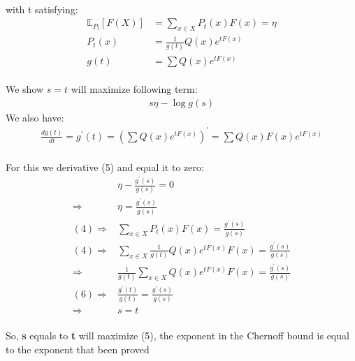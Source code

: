 \documentclass[
  course = {{EE623 Information Theory}},
  quartile = {{4}},
  assignment = 6,
  name = {{Mohammad Mahdi Rahimi}},
  studentnumber = {{20208244}},
  email = {{mahi@kaist.ac.kr}},
  firstexercise = 1
]{aga-homework}
\begin{document}
\newpage
\\
\exercise
\\\\
with t satisfying:
\begin{equation} \label{eq3}
\begin{split}
\mathbb{E}_P_t [F(X)] & = \sum_{x \in X} P_t(x)F(x) = \eta \\
P_t(x) & = \frac{1}{g(t)}Q(x)e^{tF(x)} \\
g(t) & = \sum{Q(x)e^{tF(x)}}
\end{split}
\end{equation}\\
We show $s = t$ will maximize following term:\\
\begin{equation} \label{eq3}
\begin{split}
s\eta - \log{g(s)}
\end{split}
\end{equation}
We also have:
\begin{equation} \label{eq3}
\begin{split}
\frac{dg(t)}{dt} = 
g^{\prime}(t) = (\sum{Q(x)e^{tF(x)}})^{\prime} = \sum{Q(x)F(x)e^{tF(x)}}
\end{split}
\end{equation}\\
For this we derivative (5) and equal it to zero:
\begin{equation} \label{eq3}
\begin{split}
& \eta - \frac{g^{\prime}(s)}{g(s)} = 0 \\
\Rightarrow & \eta = \frac{g^{\prime}(s)}{g(s)} \\
(4) \Rightarrow & \sum_{x \in X} P_t(x)F(x) = \frac{g^{\prime}(s)}{g(s)} \\
(4) \Rightarrow & \sum_{x \in X} \frac{1}{g(t)}Q(x)e^{tF(x)}F(x) = \frac{g^{\prime}(s)}{g(s)} \\
\Rightarrow & \frac{1}{g(t)}\sum_{x \in X} Q(x)e^{tF(x)}F(x) = \frac{g^{\prime}(s)}{g(s)} \\
(6) \Rightarrow & \frac{g^{\prime}(t)}{g(t)} = \frac{g^{\prime}(s)}{g(s)}\\
\Rightarrow & s = t
\end{split}
\end{equation}\\
So, \textbf{s} equals to \textbf{t} will maximize (5), the exponent in the Chernoff bound is equal to the exponent that been proved
\end{document}
